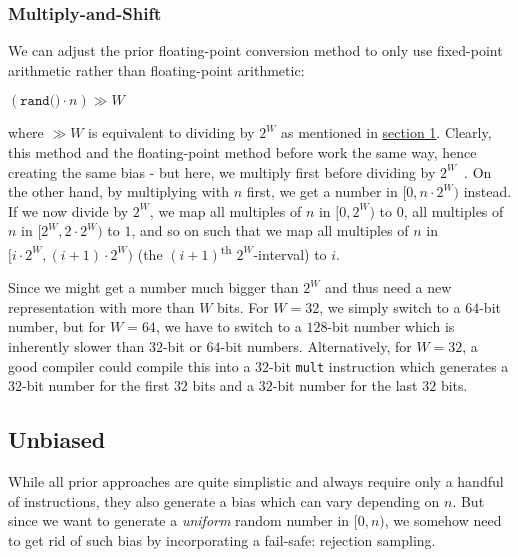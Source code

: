 \documentclass[a4paper, UKenglish, cleveref, autoref, thm-restate]{lipics-v2021}
\begin{document}
\subsubsection{Multiply-and-Shift}\label{sec:2.1.3}
We can adjust the prior floating-point conversion method to only use fixed-point arithmetic rather than floating-point arithmetic:
\begin{center}
    $\left(\texttt{rand()} \cdot n\right) \gg W$
\end{center}
where $\gg W$ is equivalent to dividing by $2^W$ as mentioned in \hyperref[sec:1.2]{section 1}.
Clearly, this method and the floating-point method before work the same way, hence creating the same bias - but here, we multiply first before dividing by $2^W$~\cite{MultShift}.
On the other hand, by multiplying with $n$ first, we get a number in $[0,n \cdot 2^W)$ instead.
If we now divide by $2^W$, we map all multiples of $n$ in $[0,2^W)$ to $0$, all multiples of $n$ in $[2^W, 2 \cdot 2^W)$ to $1$, and so on such that we map all multiples of $n$ in $[i \cdot 2^W, (i + 1) \cdot 2^W)$ (the $(i + 1)$\textsuperscript{th} $2^W$-interval) to $i$.

Since we might get a number much bigger than $2^W$ and thus need a new representation with more than $W$ bits.
For $W = 32$, we simply switch to a $64$-bit number, but for $W = 64$, we have to switch to a $128$-bit number which is inherently slower than $32$-bit or $64$-bit numbers.
Alternatively, for $W = 32$, a good compiler could compile this into a $32$-bit \texttt{mult} instruction which generates a $32$-bit number for the first $32$ bits and a $32$-bit number for the last $32$ bits.


\subsection{Unbiased}
While all prior approaches are quite simplistic and always require only a handful of instructions, they also generate a bias which can vary depending on $n$.
But since we want to generate a \emph{uniform} random number in $[0,n)$, we somehow need to get rid of such bias by incorporating a fail-safe: rejection sampling.
\end{document}
